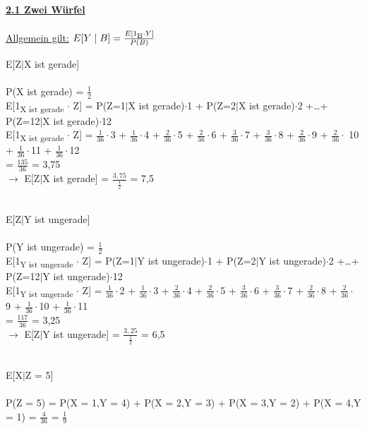 \documentclass{article}
\begin{document}
\pagestyle{fancy}
\hfill \\

\textbf{\underline{2.1 Zwei W\"urfel}} \\
\\
\underline{Allgemein gilt:} $E[Y \mid B] = \frac{E[1\textsubscript{B} \cdot Y]}{P(B)}$ \\
\begin{compactenum}[a)]
	\item E[Z$\mid$X ist gerade] \\
	\\
	P(X ist gerade) = $\frac{1}{2}$ \\
	E[1\textsubscript{X ist gerade} $\cdot$ Z] = P(Z=1$\mid$X ist gerade)$\cdot$1 + P(Z=2$\mid$X ist gerade)$\cdot$2 +\ldots + P(Z=12$\mid$X ist gerade)$\cdot$12 \\
	E[1\textsubscript{X ist gerade} $\cdot$ Z] = $\frac{1}{36}\cdot$3 + $\frac{1}{36}\cdot$4 + $\frac{2}{36}\cdot$5 + $\frac{2}{36}\cdot$6 + $\frac{3}{36}\cdot$7 + $\frac{3}{36}\cdot$8 + $\frac{2}{36}\cdot$9 + $\frac{2}{36}\cdot$ 10 + $\frac{1}{36}\cdot$11 + $\frac{1}{36}\cdot$12 \\
	= $\frac{135}{36}$ = 3,75 \\
	$\rightarrow$  E[Z$\mid$X ist gerade] = $\frac{3,75}{\frac{1}{2}}$ = 7,5 \\
	\\
	\item E[Z$\mid$Y ist ungerade] \\
	\\
	P(Y ist ungerade) = $\frac{1}{2}$ \\
	E[1\textsubscript{Y ist ungerade} $\cdot$ Z] = P(Z=1$\mid$Y ist ungerade)$\cdot$1 + P(Z=2$\mid$Y ist ungerade)$\cdot$2 +\ldots + P(Z=12$\mid$Y ist ungerade)$\cdot$12 \\
	E[1\textsubscript{Y ist ungerade} $\cdot$ Z] = $\frac{1}{36}\cdot$2 + $\frac{1}{36}\cdot$3 + $\frac{2}{36}\cdot$4 + $\frac{2}{36}\cdot$5 + $\frac{3}{36}\cdot$6 + $\frac{3}{36}\cdot$7 + $\frac{2}{36}\cdot$8 + $\frac{2}{36}\cdot$ 9 + $\frac{1}{36}\cdot$10 + $\frac{1}{36}\cdot$11 \\
	= $\frac{117}{36}$ = 3,25 \\
	$\rightarrow$  E[Z$\mid$Y ist ungerade] = $\frac{3,25}{\frac{1}{2}}$ = 6,5 \\
	\\
	\item E[X$\mid$Z = 5] \\
	\\
	P(Z = 5) = P(X = 1,Y = 4) + P(X = 2,Y = 3) + P(X = 3,Y = 2) + P(X = 4,Y = 1) = $\frac{4}{36}$ = $\frac{1}{9}$ \\

\end{compactenum}
\end{document}
